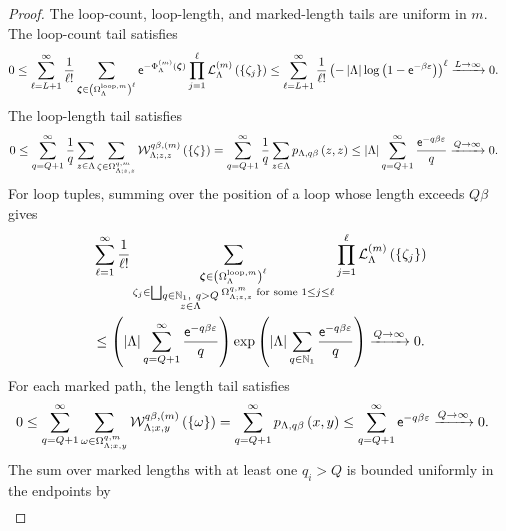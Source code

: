 \documentclass[11pt,a4paper]{article}
\theoremstyle{plain}
\theoremstyle{definition}
\theoremstyle{remark}
\begin{document}
\begin{proof}
The loop-count, loop-length, and marked-length tails are uniform in $m$.
The loop-count tail satisfies
$$\begin{aligned}
0
& \leq
\sum_{\ell=L+1}^{\infty}\frac{1}{\ell!}
\sum_{\boldsymbol{\zeta}\in\rbk{\Omega_{\Lambda}^{\mathrm{loop},m}}^{\ell}}
\napiernum^{-\fun{\Phi_{\Lambda}^{(m)}}{\boldsymbol{\zeta}}}
\prod_{j=1}^{\ell}
\fun{\msrcal{L}_{\Lambda}^{(m)}}{\setone{\zeta_j}}
\leq
\sum_{\ell=L+1}^{\infty}\frac{1}{\ell!}
\rbk{
-\abscard{\Lambda}
\log\rbk{1-\napiernum^{-\beta\varepsilon}}}^{\ell}
\xrightarrow{L \to \infty}
0.
\end{aligned}$$
The loop-length tail satisfies
$$\begin{aligned}
0
& \leq
\sum_{q=Q+1}^{\infty}\frac{1}{q}
\sum_{z\in\Lambda}
\sum_{\zeta\in\Omega_{\Lambda;z,z}^{q,m}}
\fun{\msrcal{W}_{\Lambda;z,z}^{q\beta,(m)}}{\setone{\zeta}}
=
\sum_{q=Q+1}^{\infty}\frac{1}{q}
\sum_{z\in\Lambda}
\fun{p_{\Lambda,q\beta}}{z,z}
\leq
\abscard{\Lambda}
\sum_{q=Q+1}^{\infty}
\frac{\napiernum^{-q\beta\varepsilon}}{q}
\xrightarrow{Q \to \infty}
0.
\end{aligned}$$
For loop tuples, summing over the position of a loop whose length exceeds $Q\beta$ gives
$$\begin{aligned}
&
\sum_{\ell=1}^{\infty}\frac{1}{\ell!}
\sum_{\substack{
\boldsymbol{\zeta}\in\rbk{\Omega_{\Lambda}^{\mathrm{loop},m}}^{\ell}\\
\zeta_j\in\bigsqcup_{\substack{q\in\semigrposint,\ q>Q\\z\in\Lambda}}\Omega_{\Lambda;z,z}^{q,m}
\text{ for some }1\leq j\leq\ell}}
\prod_{j=1}^{\ell}
\fun{\msrcal{L}_{\Lambda}^{(m)}}{\setone{\zeta_j}}
\\
& \leq
\rbk{
\abscard{\Lambda}
\sum_{q=Q+1}^{\infty}
\frac{\napiernum^{-q\beta\varepsilon}}{q}}
\fnexp{
\abscard{\Lambda}
\sum_{q\in\semigrposint}
\frac{\napiernum^{-q\beta\varepsilon}}{q}}
\xrightarrow{Q \to \infty}
0.
\end{aligned}$$
For each marked path, the length tail satisfies
$$\begin{aligned}
0
& \leq
\sum_{q=Q+1}^{\infty}
\sum_{\omega\in\Omega_{\Lambda;x,y}^{q,m}}
\fun{\msrcal{W}_{\Lambda;x,y}^{q\beta,(m)}}{\setone{\omega}}
=
\sum_{q=Q+1}^{\infty}
\fun{p_{\Lambda,q\beta}}{x,y}
\leq
\sum_{q=Q+1}^{\infty}\napiernum^{-q\beta\varepsilon}
\xrightarrow{Q \to \infty}
0.
\end{aligned}$$
The sum over marked lengths with at least one $q_i>Q$ is bounded uniformly in the endpoints by
$$\begin{aligned}

\end{aligned}$$
\end{proof}
\end{document}
